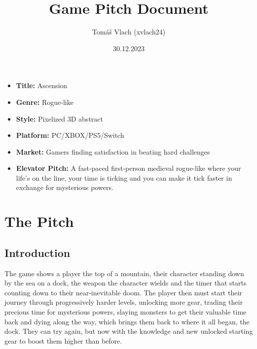 \documentclass[a4paper,10pt,english]{article}
\title{%
Game Pitch Document%
}
\author{%
Tomáš Vlach (xvlach24)%
}
\date{30.12.2023}
\begin{document}
\maketitle
\thispagestyle{empty}

{%
\large

\begin{itemize}

\item[] \textbf{Title:} Ascension 

\item[] \textbf{Genre:} Rogue-like

\item[] \textbf{Style:} Pixelized 3D abstract

\item[] \textbf{Platform:} PC/XBOX/PS5/Switch

\item[] \textbf{Market:} Gamers finding satisfaction in beating hard challenges 

\item[] \textbf{Elevator Pitch:} A fast-paced first-person medieval rogue-like where your life's on the line, your time is ticking and you can make it tick faster in exchange for mysterious powers.

\end{itemize}

}

\section*{\centering The Pitch}

\subsection*{Introduction}
The game shows a player the top of a mountain, their character standing down by the sea on a dock, the weapon the character wields and the timer that starts counting down to their near-inevitable doom. The player then must start their journey through progressively harder levels, unlocking more gear, trading their precious time for mysterious powers, slaying monsters to get their valuable time back and dying along the way, which brings them back to where it all began, the dock. They can try again, but now with the knowledge and new unlocked starting gear to boost them higher than before.
\end{document}
